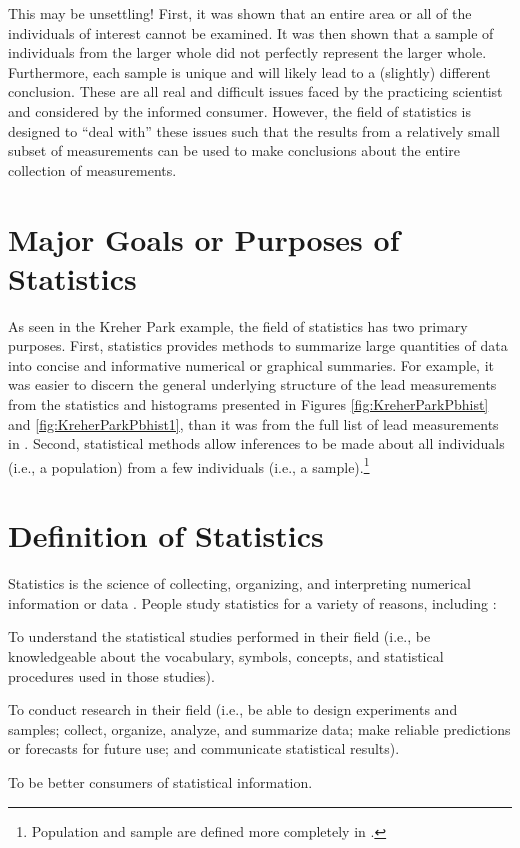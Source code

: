 \documentclass[10pt,openany]{book}\usepackage[]{graphicx}\usepackage[]{color}
\begin{document}
This may be unsettling! First, it was shown that an entire area or all of the individuals of interest cannot be examined. It was then shown that a sample of individuals from the larger whole did not perfectly represent the larger whole. Furthermore, each sample is unique and will likely lead to a (slightly) different conclusion. These are all real and difficult issues faced by the practicing scientist and considered by the informed consumer. However, the field of statistics is designed to ``deal with'' these issues such that the results from a relatively small subset of measurements can be used to make conclusions about the entire collection of measurements.



\section{Major Goals or Purposes of Statistics}
\vspace{-12pt}
As seen in the Kreher Park example, the field of statistics has two primary purposes. First, statistics provides methods to summarize large quantities of data into concise and informative numerical or graphical summaries. For example, it was easier to discern the general underlying structure of the lead measurements from the statistics and histograms presented in Figures \ref{fig:KreherParkPbhist} and \ref{fig:KreherParkPbhist1}, than it was from the full list of lead measurements in . Second, statistical methods allow inferences to be made about all individuals (i.e., a population) from a few individuals (i.e., a sample).\footnote{Population and sample are defined more completely in .}


\section{Definition of Statistics}
Statistics is the science of collecting, organizing, and interpreting numerical information or data \citep{MooreMcCabe1998}. People study statistics for a variety of reasons, including \citep{Bluman2000}:
\begin{Enumerate}
  \item To understand the statistical studies performed in their field (i.e., be knowledgeable about the vocabulary, symbols, concepts, and statistical procedures used in those studies).
  \item To conduct research in their field (i.e., be able to design experiments and samples; collect, organize, analyze, and summarize data; make reliable predictions or forecasts for future use; and communicate statistical results).
  \item To be better consumers of statistical information.
\end{Enumerate}
\end{document}
